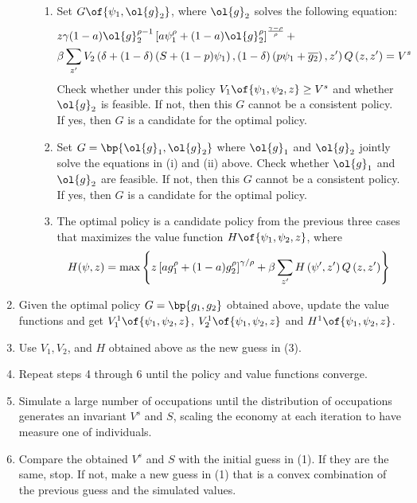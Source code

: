 \documentclass[12pt]{article}
\theoremstyle{definition}
\begin{document}
\begin{enumerate}[topsep=0pt, leftmargin=20pt, itemsep=0pt, label=(\arabic*)]
\begin{enumerate}[topsep=0pt, leftmargin=25pt, itemsep=0pt, label=(\alph*)]
\begin{enumerate}[topsep=0pt, leftmargin=30pt, itemsep=0pt, label=(\roman*)]
        \item Set $G\of{\psi_1, \ol{g}_2}$, where $\ol{g}_2$ solves the following equation:
        \begin{equation}
            \notag 
            \begin{aligned}
            & z \gamma(1-a) \ol{g}_2^{\rho-1}\left[a \psi_1^\rho+(1-a) \ol{g}_2^\rho\right]^{\frac{\gamma-\rho}{\rho}}+ \\
            & \beta \sum_{z^{\prime}} V_2\left(\delta+(1-\delta)\left(S+(1-p) \psi_1\right),(1-\delta)\left(p \psi_1+\overline{g_2}\right), z^{\prime}\right) Q\left(z, z^{\prime}\right)=V^s
            \end{aligned}
        \end{equation}
        Check whether under this policy $V_1\of{\psi_1, \psi_2, z} \geq V^s$ and whether $\ol{g}_2$ is feasible. If not, then this $G$ cannot be a consistent policy. If yes, then $G$ is a candidate for the optimal policy. 
        \item Set $G = \bp{\ol{g}_1, \ol{g}_2}$ where $\ol{g}_1$ and $\ol{g}_2$ jointly solve the equations in (i) and (ii) above. Check whether $\ol{g}_1$ and $\ol{g}_2$ are feasible. If not, then this $G$ cannot be a consistent policy. If yes, then $G$ is a candidate for the optimal policy.
        \item The optimal policy is a candidate policy from the previous three cases that maximizes the value function $H\of{\psi_1, \psi_2, z}$, where 
        \begin{equation}
            \notag 
            H(\psi, z)=\max \left\{z\left[a g_1^\rho+(1-a) g_2^\rho\right]^{\gamma / \rho}+\beta \sum_{z^{\prime}} H\left(\psi^{\prime}, z^{\prime}\right) Q\left(z, z^{\prime}\right)\right\}
        \end{equation}
    \end{enumerate}
\end{enumerate}

\item Given the optimal policy $G = \bp{g_1, g_2}$ obtained above, update the value functions and get $V_1^1\of{\psi_1, \psi_2, z}$, $V_2^1\of{\psi_1, \psi_2, z}$ and $H^1\of{\psi_1, \psi_2, z}$.
\item Use $V_1, V_2$, and $H$ obtained above as the new guess in (3).
\item Repeat steps 4 through 6 until the policy and value functions converge.
\item Simulate a large number of occupations until the distribution of occupations generates an invariant $V^s$ and $S$, scaling the economy at each iteration to have measure one of individuals.
\item Compare the obtained $V^s$ and $S$ with the initial guess in (1). If they are the same, stop.  If not, make a new guess in (1) that is a convex combination of the previous guess and  the simulated values.
\end{enumerate}
\end{document}
